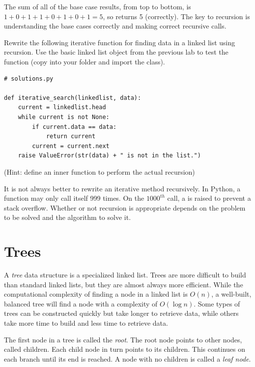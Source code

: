 The sum of all of the base case results, from top to bottom, is $1 + 0 + 1 + 1 + 0 + 1 + 0 + 1 = 5$, so  returns 5 (correctly).
The key to recursion is understanding the base cases correctly and making correct recursive calls.

\begin{problem}
Rewrite the following iterative function for finding data in a linked list using recursion.
Use the basic linked list object from the previous lab to test the function (copy  into your folder and import the  class).
\begin{lstlisting}
# solutions.py

def iterative_search(linkedlist, data):
	current = linkedlist.head
	while current is not None:
		if current.data == data:
			return current
		current = current.next
	raise ValueError(str(data) + " is not in the list.")
\end{lstlisting}
(Hint: define an inner function to perform the actual recursion)
\end{problem}

\begin{warn}
It is not always better to rewrite an iterative method recursively.
In Python, a function may only call itself 999 times.
On the $1000^{th}$ call, a  is raised to prevent a stack overflow.
Whether or not recursion is appropriate depends on the problem to be solved and the algorithm to solve it.
\end{warn}

\section*{Trees}

A \emph{tree} data structure is a specialized linked list.
Trees are more difficult to build than standard linked lists, but they are almost always more efficient.
While the computational complexity of finding a node in a linked list is $O(n)$, a well-built, balanced tree will find a node with a complexity of $O(\log{n})$.
Some types of trees can be constructed quickly but take longer to retrieve data, while others take more time to build and less time to retrieve data.

The first node in a tree is called the \emph{root}.
The root node points to other nodes, called children.
Each child node in turn points to its children.
This continues on each branch until its end is reached.
A node with no children is called a \emph{leaf node}.


